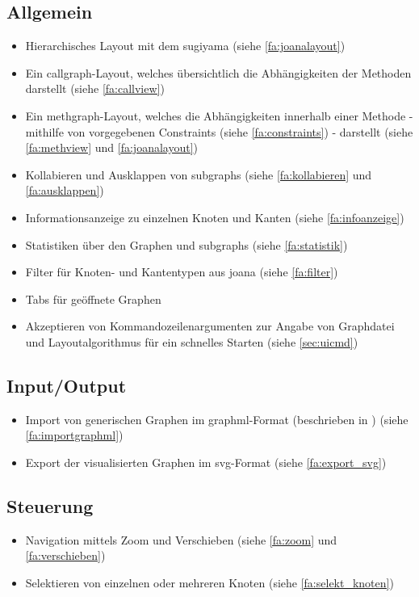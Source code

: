\subsection{Allgemein}
  \begin{itemize}
    \item Hierarchisches Layout mit dem \gls{sugiyama} (siehe \ref{fa:joanalayout})
    \item Ein \gls{callgraph}-Layout, welches übersichtlich die Abhängigkeiten der Methoden darstellt (siehe \ref{fa:callview})
    \item Ein \gls{methgraph}-Layout, welches die Abhängigkeiten innerhalb einer Methode - mithilfe von vorgegebenen Constraints (siehe \ref{fa:constraints}) - darstellt (siehe \ref{fa:methview} und \ref{fa:joanalayout})
    \item Kollabieren und Ausklappen von \glspl{subgraph} (siehe \ref{fa:kollabieren} und \ref{fa:ausklappen})
    \item Informationsanzeige zu einzelnen Knoten und Kanten (siehe \ref{fa:infoanzeige})
    \item Statistiken über den Graphen und \glspl{subgraph} (siehe \ref{fa:statistik})
    \item Filter für Knoten- und Kantentypen aus \gls{joana} (siehe \ref{fa:filter})
    \item Tabs für geöffnete Graphen %
    \item Akzeptieren von Kommandozeilenargumenten zur Angabe von Graphdatei und Layoutalgorithmus für ein schnelles Starten (siehe \ref{sec:uicmd})
  \end{itemize}

\subsection{Input/Output}
  \begin{itemize}
    \item Import von generischen Graphen im \gls{graphml}-Format (beschrieben in ) (siehe \ref{fa:importgraphml})
    \item Export der visualisierten Graphen im \gls{svg}-Format (siehe \ref{fa:export_svg})
  \end{itemize}

\subsection{Steuerung}
  \begin{itemize}
    \item Navigation mittels Zoom und Verschieben (siehe \ref{fa:zoom} und \ref{fa:verschieben})
    \item Selektieren von einzelnen oder mehreren Knoten (siehe \ref{fa:selekt_knoten})
  \end{itemize}

